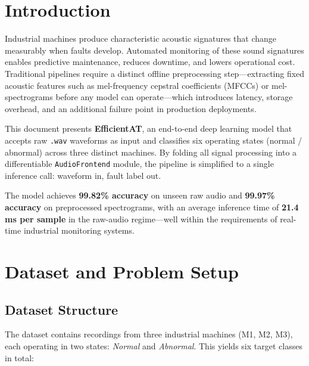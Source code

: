 \documentclass[12pt,a4paper]{article}
\begin{document}
\tableofcontents
\newpage

\section{Introduction}

Industrial machines produce characteristic acoustic signatures that change measurably when faults develop. Automated monitoring of these sound signatures enables predictive maintenance, reduces downtime, and lowers operational cost. Traditional pipelines require a distinct offline preprocessing step—extracting fixed acoustic features such as mel-frequency cepstral coefficients (MFCCs) or mel-spectrograms before any model can operate—which introduces latency, storage overhead, and an additional failure point in production deployments.

This document presents \textbf{EfficientAT}, an end-to-end deep learning model that accepts raw \texttt{.wav} waveforms as input and classifies six operating states (normal / abnormal) across three distinct machines. By folding all signal processing into a differentiable \texttt{AudioFrontend} module, the pipeline is simplified to a single inference call: waveform in, fault label out.

The model achieves \textbf{99.82\% accuracy} on unseen raw audio and \textbf{99.97\% accuracy} on preprocessed spectrograms, with an average inference time of \textbf{21.4 ms per sample} in the raw-audio regime—well within the requirements of real-time industrial monitoring systems.

\section{Dataset and Problem Setup}

\subsection{Dataset Structure}

The dataset contains recordings from three industrial machines (M1, M2, M3), each operating in two states: \emph{Normal} and \emph{Abnormal}. This yields six target classes in total:
\end{document}
